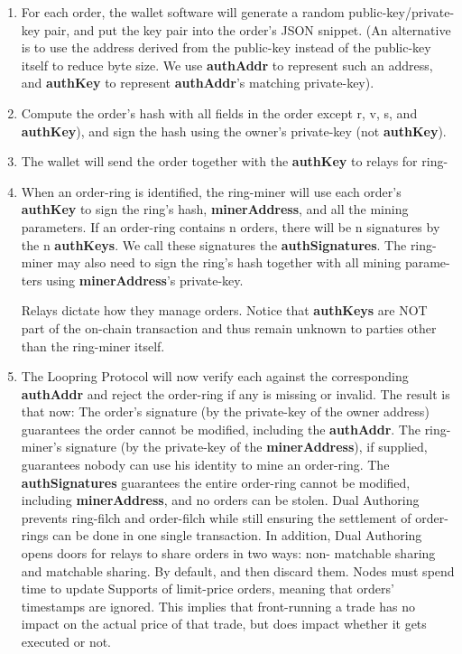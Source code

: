 \documentclass[]{article}
\begin{document}
		\begin{enumerate}
			\item For each order, the wallet software will generate a
			random public-key/private-key pair, and put the key
			pair into the order's JSON snippet. (An alternative is
			to use the address derived from the public-key instead
			of the public-key itself to reduce byte size. We use
			\textbf{authAddr} to represent such an address, and \textbf{authKey}
			to represent \textbf{authAddr}'s matching private-key).
			\item Compute the order's hash with all fields in the order
			except r, v, s, and \textbf{authKey}), and sign the hash using
			the owner's private-key (not \textbf{authKey}).
			\item The wallet will send the order together with the
			\textbf{authKey} to relays for ring-
			\item When an order-ring is identified, the ring-miner will
			use each order's \textbf{authKey} to sign the ring's hash,
			\textbf{minerAddress}, and all the mining parameters. If an
			order-ring contains n orders, there will be n signatures
			by the n \textbf{authKeys}. We call these signatures the
			\textbf{authSignatures}. The ring-miner may also need to
			sign the ring's hash together with all mining parame-
			ters using \textbf{minerAddress}'s private-key.
		
			Relays dictate how they manage orders.
			Notice that \textbf{authKeys} are NOT part
			of the on-chain transaction and thus remain unknown
			to parties other than the ring-miner itself.
			\item The Loopring Protocol will now verify each
			against the corresponding \textbf{authAddr}
			and reject the order-ring if any
			is missing or invalid.
			The result is that now:
			The order's signature (by the private-key of the owner
			address) guarantees the order cannot be modified,
			including the \textbf{authAddr}.
			The ring-miner's signature (by the private-key of the
			\textbf{minerAddress}), if supplied, guarantees nobody can
			use his identity to mine an order-ring.
			The \textbf{authSignatures} guarantees the entire order-ring
			cannot be modified, including \textbf{minerAddress}, and no
			orders can be stolen.
			Dual Authoring prevents ring-filch and order-filch while
			still ensuring the settlement of order-rings can be done
			in one single transaction. In addition, Dual Authoring
			opens doors for relays to share orders in two ways: non-
			matchable sharing and matchable sharing. By default,	
			and then discard them. Nodes must spend time to update
			Supports of limit-price orders, meaning that orders'
			timestamps are ignored.
			This implies that front-running a trade has no impact on
			the actual price of that trade, but does impact whether it
			gets executed or not.
			\end{enumerate}
		
\end{document}
